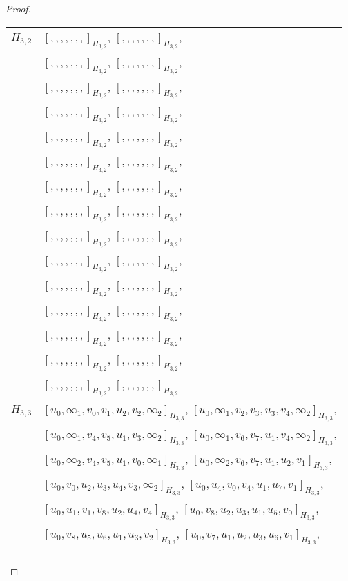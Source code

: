 \begin{subappendices}
\begin{proof}
{ \small
\begin{longtable}{|c|l|}
\hline
$H_{3,2}$ &
  $[, , , , , , ,]_{H_{3,2}}$,
  $[, , , , , , ,]_{H_{3,2}}$, \\* &
  $[, , , , , , ,]_{H_{3,2}}$,
  $[, , , , , , ,]_{H_{3,2}}$, \\* &
  $[, , , , , , ,]_{H_{3,2}}$,
  $[, , , , , , ,]_{H_{3,2}}$, \\* &
  $[, , , , , , ,]_{H_{3,2}}$,
  $[, , , , , , ,]_{H_{3,2}}$, \\* &
  $[, , , , , , ,]_{H_{3,2}}$,
  $[, , , , , , ,]_{H_{3,2}}$, \\* &
  $[, , , , , , ,]_{H_{3,2}}$,
  $[, , , , , , ,]_{H_{3,2}}$, \\* &
  $[, , , , , , ,]_{H_{3,2}}$,
  $[, , , , , , ,]_{H_{3,2}}$, \\* &
  $[, , , , , , ,]_{H_{3,2}}$,
  $[, , , , , , ,]_{H_{3,2}}$, \\* &
  $[, , , , , , ,]_{H_{3,2}}$,
  $[, , , , , , ,]_{H_{3,2}}$, \\* &
  $[, , , , , , ,]_{H_{3,2}}$,
  $[, , , , , , ,]_{H_{3,2}}$, \\* &
  $[, , , , , , ,]_{H_{3,2}}$,
  $[, , , , , , ,]_{H_{3,2}}$, \\* &
  $[, , , , , , ,]_{H_{3,2}}$,
  $[, , , , , , ,]_{H_{3,2}}$, \\* &
  $[, , , , , , ,]_{H_{3,2}}$,
  $[, , , , , , ,]_{H_{3,2}}$, \\* &
  $[, , , , , , ,]_{H_{3,2}}$,
  $[, , , , , , ,]_{H_{3,2}}$, \\* &
  $[, , , , , , ,]_{H_{3,2}}$,
  $[, , , , , , ,]_{H_{3,2}}$
\\ \hline
$H_{3,3}$ &
  $[u_0, \infty_1, v_0, v_1, u_2, v_2, \infty_2]_{H_{3,3}}$,
  $[u_0, \infty_1, v_2, v_3, u_3, v_4, \infty_2]_{H_{3,3}}$, \\* &
  $[u_0, \infty_1, v_4, v_5, u_1, v_3, \infty_2]_{H_{3,3}}$,
  $[u_0, \infty_1, v_6, v_7, u_1, v_4, \infty_2]_{H_{3,3}}$, \\* &
  $[u_0, \infty_2, v_4, v_5, u_1, v_0, \infty_1]_{H_{3,3}}$,
  $[u_0, \infty_2, v_6, v_7, u_1, u_2, v_1]_{H_{3,3}}$, \\* &
  $[u_0, v_0, u_2, u_3, u_4, v_3, \infty_2]_{H_{3,3}}$,
  $[u_0, u_4, v_0, v_4, u_1, u_7, v_1]_{H_{3,3}}$, \\* &
  $[u_0, u_1, v_1, v_8, u_2, u_4, v_4]_{H_{3,3}}$,
  $[u_0, v_8, u_2, u_3, u_1, u_5, v_0]_{H_{3,3}}$, \\* &
  $[u_0, v_8, u_5, u_6, u_1, u_3, v_2]_{H_{3,3}}$,
  $[u_0, v_7, u_1, u_2, u_3, u_6, v_1]_{H_{3,3}}$, \\* &

\end{longtable}}
\end{proof}
\end{subappendices}
